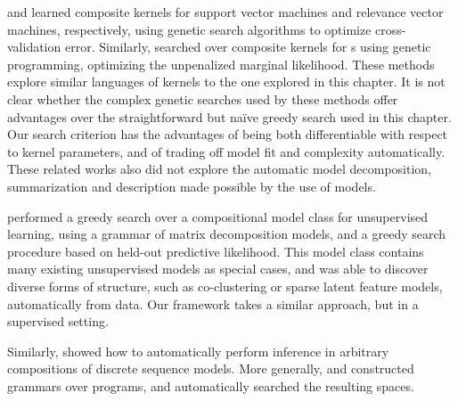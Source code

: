 \citet{diosan2007evolving} and \citet{bing2010gp} learned composite kernels for support vector machines and relevance vector machines, respectively, using genetic search algorithms to optimize cross-validation error.
Similarly, \citet{kronberger2013evolution} searched over composite kernels for \gp{}s using genetic programming, optimizing the unpenalized marginal likelihood.
These methods explore similar languages of kernels to the one explored in this chapter.
It is not clear whether the complex genetic searches used by these methods offer advantages over the straightforward but na\"{i}ve greedy search used in this chapter.
Our search criterion has the advantages of being both differentiable with respect to kernel parameters, and of trading off model fit and complexity automatically.
These related works also did not explore the automatic model decomposition, summarization and description made possible by the use of \gp{} models.


\citet{grosse2012exploiting} performed a greedy search over a compositional model class for unsupervised learning, using a grammar of matrix decomposition models, and a greedy search procedure based on held-out predictive likelihood.
This model class contains many existing unsupervised models as special cases, and was able to discover diverse forms of structure, such as co-clustering or sparse latent feature models, automatically from data.
Our framework takes a similar approach, but in a supervised setting.

Similarly, \citet{christian-thesis} showed how to automatically perform inference in arbitrary compositions of discrete sequence models.
More generally, \citet{dechter2013bootstrap} and \citet{liang2010learning} constructed grammars over programs, and automatically searched the resulting spaces.





